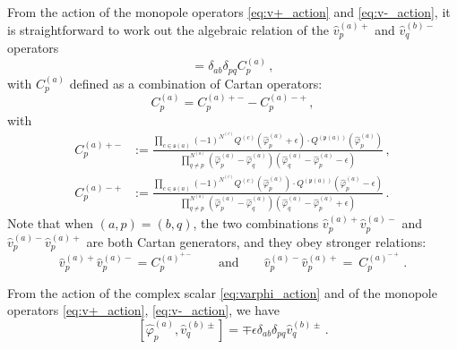 \documentclass[12pt,a4paper]{article}
\newcounter{subsubsubsection}[subsubsection]
\renewcommand{\(}{\left(}
\renewcommand{\)}{\right)}
\newcommand{\eps}{\epsilon}
\renewcommand{\(}{\left(}
\renewcommand{\)}{\right)}
\begin{document}

From the action of the monopole operators \eqref{eq:v+_action} and \eqref{eq:v-_action}, it is straightforward to work out the algebraic relation of the $\hat{v}^{(a)+}_p$ and $\hat{v}^{(b)-}_q$ operators 
\begin{equation}
[\hat{v}^{(a)+}_p,\hat{v}^{(b)-}_q]=\delta_{ab}\delta_{pq} C^{(a)}_p\,,
\end{equation}
with $C^{(a)}_p$ defined as a combination of Cartan operators:
\begin{equation}
C^{(a)}_p=C^{(a)+-}_p-C^{(a)-+}_p\,,    
\end{equation}
with
{\footnotesize
\begin{equation}\label{eq:C+C-}
\begin{aligned}
C^{(a)+-}_p&:=\frac{\prod_{c\in \mathfrak{s}(a)}(-1)^{N^{(c)}}Q^{(c)}(\hat{\varphi}^{(a)}_p+\epsilon)\cdot Q^{(\mathfrak{p}(a))}(\hat{\varphi}^{(a)}_p)}{\prod_{q\neq p}^{N^{(a)}}(\hat{\varphi}^{(a)}_p-\hat{\varphi}^{(a)}_q)(\hat{\varphi}^{(a)}_q-\hat{\varphi}^{(a)}_p-\epsilon)}\,,\\
C^{(a)-+}_p&:=\frac{\prod_{c\in \mathfrak{s}(a)}(-1)^{N^{(c)}}Q^{(c)}(\hat{\varphi}^{(a)}_p)\cdot Q^{(\mathfrak{p}(a))}(\hat{\varphi}^{(a)}_p-\eps)}{\prod_{q\neq p}^{N^{(a)}}(\hat{\varphi}^{(a)}_p-\hat{\varphi}^{(a)}_q)(\hat{\varphi}^{(a)}_q-\hat{\varphi}^{(a)}_p+\epsilon)}\,.
\end{aligned}
\end{equation}}
Note that when $(a,p)=(b,q)$, the two combinations $\hat{v}^{(a)+}_p\hat{v}^{(a)-}_p$ and $\hat{v}^{(a)-}_p\hat{v}^{(a)+}_p$ are both Cartan generators, and they obey stronger relations:
\begin{equation}\label{eq:v+v-_relation}
\hat{v}^{(a)+}_p \hat{v}^{(a)-}_p= C^{(a)^{+-}}_p
\qquad\textrm{and}\qquad
\hat{v}^{(a)-}_p \hat{v}^{(a)+}_p=\ C^{(a)^{-+}}_p\,.
\end{equation}





From the action of the complex scalar \eqref{eq:varphi_action} and of the monopole operators \eqref{eq:v+_action}, \eqref{eq:v-_action}, we have
\begin{equation}\label{eq:phiv+- relation}
[\hat{\varphi}^{(a)}_p, \hat{v}^{(b)\pm}_q]=\mp\epsilon\delta_{ab}\delta_{pq}\hat{v}^{(b)\pm}_q\,.
\end{equation}
\end{document}
